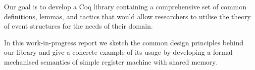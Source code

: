 Our goal is to develop a Coq library containing 
a comprehensive set of common definitions, lemmas, 
and tactics that would allow researchers 
to utilise the theory of event structures 
for the needs of their domain.

In this work-in-progress report we sketch 
the common design principles behind our library
and give a concrete example of its usage  
by developing a formal mechanised semantics of simple 
register machine with shared memory.
